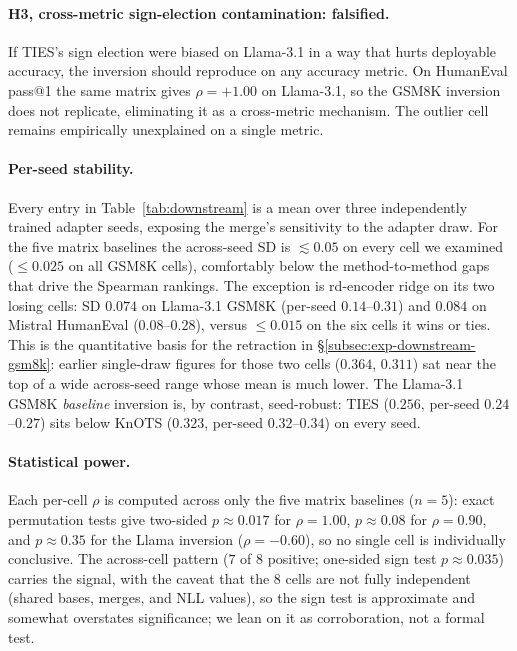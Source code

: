 \paragraph{H3, cross-metric sign-election contamination:
falsified.} If TIES's sign election were biased on Llama-3.1 in a way
that hurts deployable accuracy, the inversion should reproduce on any
accuracy metric. On HumanEval pass@1 the same matrix gives
$\rho = +1.00$ on Llama-3.1, so the GSM8K inversion does not
replicate, eliminating it as a cross-metric mechanism. The outlier
cell remains empirically unexplained on a single metric.

\paragraph{Per-seed stability.} Every entry in
Table~\ref{tab:downstream} is a mean over three independently trained
adapter seeds, exposing the merge's sensitivity to the adapter draw.
For the five matrix baselines the across-seed SD is $\lesssim 0.05$ on
every cell we examined ($\leq 0.025$ on all GSM8K cells), comfortably
below the method-to-method gaps that drive the Spearman rankings. The
exception is rd-encoder ridge on its two losing cells: SD $0.074$ on
Llama-3.1 GSM8K (per-seed $0.14$--$0.31$) and $0.084$ on Mistral
HumanEval ($0.08$--$0.28$), versus $\leq 0.015$ on the six cells it
wins or ties. This is the quantitative basis for the retraction in
\S\ref{subsec:exp-downstream-gsm8k}: earlier single-draw figures for
those two cells ($0.364$, $0.311$) sat near the top of a wide
across-seed range whose mean is much lower. The Llama-3.1 GSM8K
\emph{baseline} inversion is, by contrast, seed-robust: TIES
($0.256$, per-seed $0.24$--$0.27$) sits below KnOTS ($0.323$,
per-seed $0.32$--$0.34$) on every seed.

\paragraph{Statistical power.} Each per-cell $\rho$ is computed across
only the five matrix baselines ($n = 5$): exact permutation tests give
two-sided $p \approx 0.017$ for $\rho = 1.00$, $p \approx 0.08$ for
$\rho = 0.90$, and $p \approx 0.35$ for the Llama inversion
($\rho = -0.60$), so no single cell is individually conclusive. The
across-cell pattern ($7$ of $8$ positive; one-sided sign test
$p \approx 0.035$) carries the signal, with the caveat that the $8$
cells are not fully independent (shared bases, merges, and NLL
values), so the sign test is approximate and somewhat overstates
significance; we lean on it as corroboration, not a formal test.
